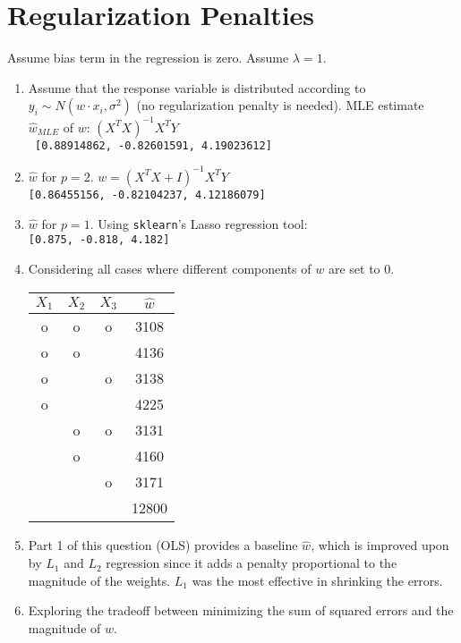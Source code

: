 \section{Regularization Penalties}
Assume bias term in the regression is zero. Assume $\lambda = 1$. 
\begin{enumerate}
    \item Assume that the response variable is distributed according to $y_{i} \sim N\left(w \cdot x_{i}, \sigma^{2}\right)$ (no regularization penalty is needed). MLE estimate $\widehat{w}_{M L E}$ of $w$:
    $ (X^T X)^{-1} X^TY $ \\
    \verb| [0.88914862, -0.82601591, 4.19023612]|
    \item $\widehat{w}$ for $p = 2$. $w = (X^T X + I)^{-1}X^TY$ \\
    \verb|[0.86455156, -0.82104237, 4.12186079]|
    \item $\widehat{w}$ for $p = 1$. Using \verb|sklearn|'s Lasso regression tool: \\
    \verb|[0.875, -0.818, 4.182]|    
    \item Considering all cases where different components of $w$ are set to 0.
\begin{table}[h]
    	\centering
    	\begin{tabular}{|c|c|c|c|}
    		\hline
    		$X_1$ & $X_2$ & $X_3$ & $\widehat{w}$ \\ \hline
    		o    & o    & o    & 3108               \\
    		o    & o    &      & 4136               \\
    		o    &      & o    & 3138               \\
    		o    &      &      & 4225               \\
			     & o    & o    & 3131               \\
			     & o    &      & 4160               \\
			     &      & o    & 3171               \\
			     &      &      & 12800               \\ \hline    		    		
    	\end{tabular}
    \end{table}
    \item Part 1 of this question (OLS) provides a baseline $\widehat{w}$, which is improved upon by $L_1$ and $L_2$ regression since it adds a penalty proportional to the magnitude of the weights. $L_1$ was the most effective in shrinking the errors.
    \item Exploring the tradeoff between minimizing the sum of squared errors and the magnitude of $\widehat{w}$.

\end{enumerate}
